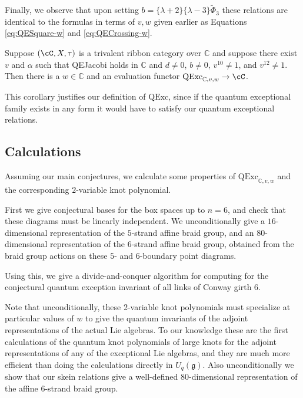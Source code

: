 \documentclass[12pt]{amsart}
\begin{document}
Finally, we observe that upon setting $b = \{\lambda+2\}\{\lambda-3\}\widetilde{\Phi}_3$ these relations are identical to the formulas in terms of $v,w$ given earlier as Equations \eqref{eq:QESquare-w} and \eqref{eq:QECrossing-w}.

\begin{corollary}
Suppose $(\cC, X, \tau)$ is a trivalent ribbon category over $\mathbb{C}$ and suppose there exist $v$ and $\alpha$ such that QEJacobi holds in $\mathbb{C}$ and $d \neq 0 $, $b \neq 0$, $v^{10} \neq 1$, and $v^{12} \neq 1$.  Then there is a $w \in \mathbb{C}$ and an evaluation functor $\mathrm{QExc}_{\mathbb{C},v,w} \rightarrow \cC$.
\end{corollary}

This corollary justifies our definition of $\mathrm{QExc}$, since if the quantum exceptional family exists in any form it would have to satisfy our quantum exceptional relations.


\subsection{Calculations}


Assuming our main conjectures, we calculate some properties of $\mathrm{QExc}_{\mathbb{C},v,w}$ and the corresponding $2$-variable knot polynomial.

First we give conjectural bases for the box spaces up to $n=6$, and check that these
diagrams must be linearly independent.  We unconditionally give a
$16$-dimensional representation of the $5$-strand affine braid group, and an
$80$-dimensional representation of the $6$-strand affine braid group, obtained
from the braid group actions on these $5$- and $6$-boundary point diagrams.

Using this, we give a divide-and-conquer algorithm for computing for the
conjectural quantum exception invariant of all links of Conway girth 6. 

Note that unconditionally, these 2-variable knot polynomials must specialize
at particular values of $w$ to give the quantum invariants of the adjoint
representations of the actual Lie algebras.  To our knowledge these are the
first calculations of the quantum knot polynomials of large knots for the
adjoint representations of any of the exceptional Lie algebras, and they are
much more efficient than doing the calculations directly in
$U_q(\mathfrak{g})$.  Also unconditionally we show that our skein relations
give a well-defined $80$-dimensional representation of the affine $6$-strand
braid group.
\end{document}
